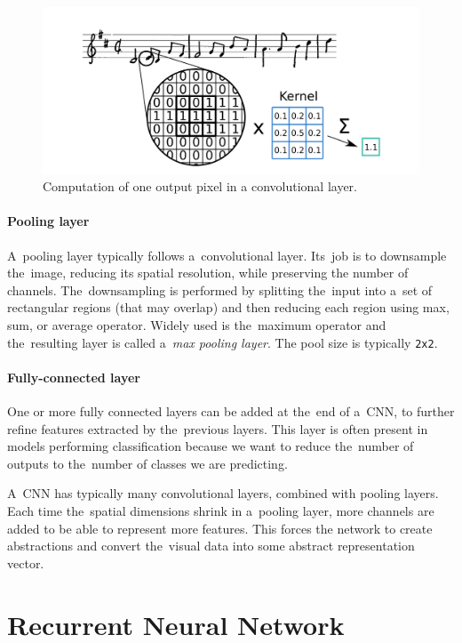 \begin{figure}[h]
    \centering
    \includegraphics[width=140mm]{../img/convolution}
    \caption{Computation of one output pixel in a convolutional layer.}
    \label{fig3:Convolution}
\end{figure}

\paragraph{Pooling layer} A~pooling layer typically follows a~convolutional layer. Its~job is to downsample the~image, reducing its spatial resolution, while preserving the number of channels. The~downsampling is performed by splitting the~input into a~set of rectangular regions (that may overlap) and then reducing each region using max, sum, or average operator. Widely used is the~maximum operator and the~resulting layer is called a~\emph{max pooling layer}. The pool size is typically \texttt{2x2}.

\paragraph{Fully-connected layer} One or more fully connected layers can be added at the~end of a~CNN, to further refine features extracted by the~previous layers. This layer is often present in models performing classification because we want to reduce the~number of outputs to the~number of classes we are predicting.

A~CNN has typically many convolutional layers, combined with pooling layers. Each time the~spatial dimensions shrink in a~pooling layer, more channels are added to be able to represent more features. This forces the network to create abstractions and convert the~visual data into some abstract representation vector.


\section{Recurrent Neural Network}

